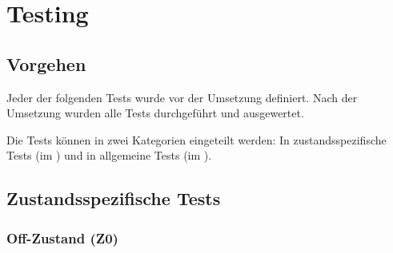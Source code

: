 \chapter{Testing}
\label{chap:testing}


\section{Vorgehen}
Jeder der folgenden Tests wurde vor der Umsetzung definiert.
Nach der Umsetzung wurden alle Tests durchgeführt und ausgewertet.

Die Tests können in zwei Kategorien eingeteilt werden:
In zustandsspezifische Tests (im ) und in allgemeine Tests (im ).

\newpage
\section{Zustandsspezifische Tests}
\label{sec:stateSpecificTest}
\subsection{Off-Zustand (Z0)}
